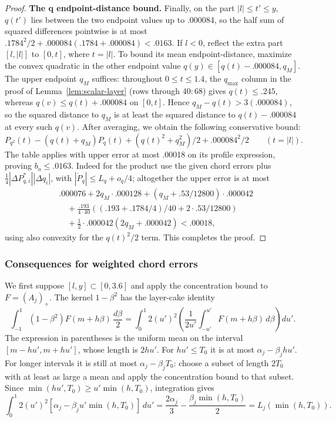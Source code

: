 \begin{proof}
\smallskip
\noindent\textbf{The q endpoint-distance bound.}\quad
Finally, on the part \(|l|\le t'\le y\), \(q(t')\) lies between the two endpoint values up to .000084, so the half sum of squared differences pointwise is at most
\(.1784^2/2+.000084( .1784+.000084)<.0163\). If $l<0$, reflect the extra part $[l,|l|]$ to $[0,t]$, where $t=|l|$.
To bound its mean endpoint-distance, maximize the convex quadratic in
the other endpoint value $q(y)\in[q(t)-.000084,q_M]$.
The upper endpoint $q_M$ suffices: throughout $0\le t\le1.4$,
the $q_{\max}$ column in the proof of Lemma~\ref{lem:scalar-layer}
(rows through $40{:}68$) gives $q(t)\le.245$, whereas
$q(v)\le q(t)+.000084$ on $[0,t]$. Hence
$q_M-q(t)>3(.000084)$, so the squared distance to $q_M$ is at least
the squared distance to $q(t)-.000084$ at every such $q(v)$.
After averaging, we obtain the following conservative bound:
\[
 P_{q^2}(t)-(q(t)+q_M)P_q(t)+(q(t)^2+q_M^2)/2+.000084^2/2
 \qquad (t=|l|).
\]
The table applies with upper error at most .00018 on its profile expression, proving \(b_a\le.0163\). Indeed for the product use the given chord errors plus \(\tfrac14|\Delta P_{q,i}^*||\Delta q_i|\), with \(|\dot P_q|\le L_q+o_q/4\); altogether the upper error is at most
\[
\begin{aligned}
 &.000076+2q_M\cdot.000128+(q_M+.53/12800)\cdot.000042\\
 &\quad+\frac{.193}{4\cdot40}
       \left((.193+.1784/4)/40+2\cdot.53/12800\right)\\
 &\quad+\tfrac12\cdot.000042(2q_M+.000042)<.00018,
\end{aligned}
\]
using also convexity for the \(q(t)^2/2\) term.
This completes the proof.
\end{proof}

\subsubsection{Consequences for weighted chord errors}

We first suppose $[l,y]\subset[0,3.6]$ and apply the concentration
bound to $F=(A_j)_+$. The kernel $1-\beta^2$ has the layer-cake identity
\[
 \int_{-1}^1(1-\beta^2)F(m+h\beta)\,\frac{d\beta}{2}
 =\int_0^1 2(u')^2
   \left(\frac1{2u'}\int_{-u'}^{u'}F(m+h\beta)\,d\beta\right)du'.
\]
The expression in parentheses is the uniform mean on the interval
$[m-hu',m+hu']$, whose length is $2hu'$.
For $hu'\le T_0$ it is at most $\alpha_j-\beta_jhu'$.
For longer intervals it is still at most $\alpha_j-\beta_jT_0$:
choose a subset of length $2T_0$ with at least as large a mean and
apply the concentration bound to that subset.
Since $\min(hu',T_0)\ge u'\min(h,T_0)$, integration gives
\[
 \int_0^1 2(u')^2
       [\alpha_j-\beta_j u'\min(h,T_0)]\,du'
 =\frac{2\alpha_j}{3}-\frac{\beta_j\min(h,T_0)}2
 =L_j(\min(h,T_0)).
\]

